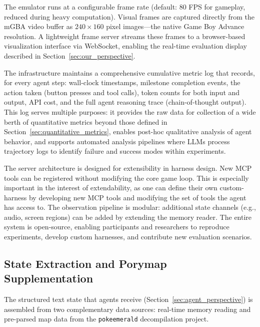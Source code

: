 The emulator runs at a configurable frame rate (default: 80 FPS for gameplay, reduced during heavy computation). Visual frames are captured directly from the mGBA video buffer as $240 \times 160$ pixel images---the native Game Boy Advance resolution. A lightweight frame server streams these frames to a browser-based visualization interface via WebSocket, enabling the real-time evaluation display described in Section~\ref{sec:our_perspective}.

The infrastructure maintains a comprehensive cumulative metric log that records, for every agent step: wall-clock timestamps, milestone completion events, the action taken (button presses and tool calls), token counts for both input and output, API cost, and the full agent reasoning trace (chain-of-thought output). This log serves multiple purposes: it provides the raw data for collection of a wide berth of quantitative metrics beyond those defined in Section~\ref{sec:quantitative_metrics}, enables post-hoc qualitative analysis of agent behavior, and supports automated analysis pipelines where LLMs process trajectory logs to identify failure and success modes within experiments.

The server architecture is designed for extensibility in harness design. New MCP tools can be registered without modifying the core game loop. This is especially important in the interest of extendability, as one can define their own custom-harness by developing new MCP tools and modifying the set of tools the agent has access to. The observation pipeline is modular: additional state channels (e.g., audio, screen regions) can be added by extending the memory reader. The entire system is open-source, enabling participants and researchers to reproduce experiments, develop custom harnesses, and contribute new evaluation scenarios.

\subsection{State Extraction and Porymap Supplementation}\label{sec:appendix_state_extraction}

The structured text state that agents receive (Section~\ref{sec:agent_perspective}) is assembled from two complementary data sources: real-time memory reading and pre-parsed map data from the \texttt{pokeemerald} decompilation project.

